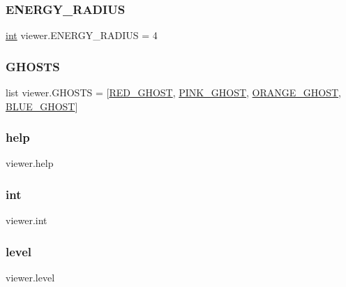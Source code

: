\subsubsection{\texorpdfstring{E\+N\+E\+R\+G\+Y\+\_\+\+R\+A\+D\+I\+US}{ENERGY\_RADIUS}}
{\footnotesize\ttfamily \hyperlink{namespaceviewer_ad9bf277fee851c5eadd676fe6f1a24e8}{int} viewer.\+E\+N\+E\+R\+G\+Y\+\_\+\+R\+A\+D\+I\+US = 4}

\mbox{\label{namespaceviewer_acf3b118d8806b60e75950eb17c346ff7}} 
\subsubsection{\texorpdfstring{G\+H\+O\+S\+TS}{GHOSTS}}
{\footnotesize\ttfamily list viewer.\+G\+H\+O\+S\+TS = \mbox{[}\hyperlink{namespaceviewer_a49becc796180fd2036cad73589a3cfcc}{R\+E\+D\+\_\+\+G\+H\+O\+ST}, \hyperlink{namespaceviewer_abe62d2acf5d0c83805fa210e5e88eca2}{P\+I\+N\+K\+\_\+\+G\+H\+O\+ST}, \hyperlink{namespaceviewer_a8dd3905e87c1c9dfdb99de2c99d24bd8}{O\+R\+A\+N\+G\+E\+\_\+\+G\+H\+O\+ST}, \hyperlink{namespaceviewer_a597b296be3b6c09a7759a6b15e8691d2}{B\+L\+U\+E\+\_\+\+G\+H\+O\+ST}\mbox{]}}

\mbox{\label{namespaceviewer_a4519b0a4a06be2d506044dbada863c7e}} 
\subsubsection{\texorpdfstring{help}{help}}
{\footnotesize\ttfamily viewer.\+help}

\mbox{\label{namespaceviewer_ad9bf277fee851c5eadd676fe6f1a24e8}} 
\subsubsection{\texorpdfstring{int}{int}}
{\footnotesize\ttfamily viewer.\+int}

\mbox{\label{namespaceviewer_ae5293c9bdae639c8c4c58c076722d755}} 
\subsubsection{\texorpdfstring{level}{level}}
{\footnotesize\ttfamily viewer.\+level}

